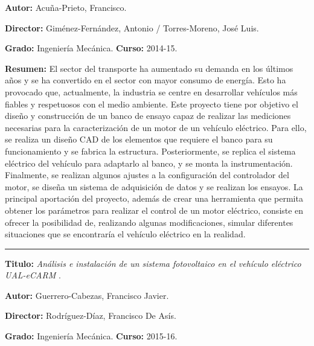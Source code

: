 \textbf{Autor:} Acuña-Prieto, Francisco.

\textbf{Director:} Giménez-Fernández, Antonio / Torres-Moreno, José Luis.

\textbf{Grado:} Ingeniería Mecánica. \textbf{Curso:} 2014-15.

\textbf{Resumen:} El sector del transporte ha aumentado su demanda en los últimos años y se ha convertido en el sector con mayor consumo de energía. Esto ha provocado que, actualmente, la industria se centre en desarrollar vehículos más fiables y respetuosos con el medio ambiente. Este proyecto tiene por objetivo el diseño y construcción de un banco de ensayo capaz de realizar las mediciones necesarias para la caracterización de un motor de un vehículo eléctrico. Para ello, se realiza un diseño CAD de los elementos que requiere el banco para su funcionamiento y se fabrica la estructura. Posteriormente, se replica el sistema eléctrico del vehículo para adaptarlo al banco, y se monta la instrumentación. Finalmente, se realizan algunos ajustes a la configuración del controlador del motor, se diseña un sistema de adquisición de datos y se realizan los ensayos. La principal aportación del proyecto, además de crear una herramienta que permita obtener los parámetros para realizar el control de un motor eléctrico, consiste en ofrecer la posibilidad de, realizando algunas modificaciones, simular diferentes situaciones que se encontraría el vehículo eléctrico en la realidad.
 
\vspace{6pt} \hrule \vspace{6pt}
 
\textbf{Titulo:} \textit{Análisis e instalación de un sistema fotovoltaico en el vehículo eléctrico UAL-eCARM} \cite{guerrero2015solar}.

\textbf{Autor:} Guerrero-Cabezas, Francisco Javier.

\textbf{Director:} Rodríguez-Díaz, Francisco De Asís.

\textbf{Grado:} Ingeniería Mecánica. \textbf{Curso:} 2015-16. 

 

